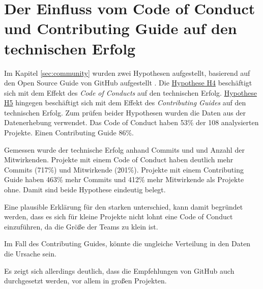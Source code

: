 



\section{Der Einfluss vom Code of Conduct und Contributing Guide auf den technischen Erfolg}

Im Kapitel \ref{sec:community} wurden zwei Hypothesen aufgestellt, basierend auf den Open Source 
Guide von GitHub aufgestellt \cite{GitHubBuildingWelcomingCommunities2022}.
Die \hyperref[H:4]{Hypothese H4} beschäftigt sich mit dem Effekt des \textit{Code of Conducts} auf
den technischen Erfolg. \hyperref[H:5]{Hypothese H5} hingegen beschäftigt sich mit dem Effekt des
\textit{Contributing Guides} auf den technischen Erfolg.
Zum prüfen beider Hypothesen wurden die Daten aus der Datenerhebung verwendet.
Das Code of Conduct haben 53\% der 108 analysierten Projekte. Einen Contributing Guide 86\%.

Gemessen wurde der technische Erfolg anhand Commits und und Anzahl der Mitwirkenden. Projekte mit 
einem Code of Conduct haben deutlich mehr Commits (717\%) und Mitwirkende (201\%).
Projekte mit einem Contributing Guide haben 463\% mehr Commits und 412\% mehr Mitwirkende als Projekte 
ohne.
Damit sind beide Hypothese eindeutig belegt.

Eine plausible Erklärung für den starken unterschied, kann damit begründet werden, dass es sich für 
kleine Projekte nicht lohnt eine Code of Conduct einzuführen, da die Größe der Teams zu klein ist.

Im Fall des Contributing Guides, könnte die ungleiche Verteilung in den Daten die Ursache sein.

Es zeigt sich allerdings deutlich, dass die Empfehlungen von GitHub auch durchgesetzt werden, vor allem
in großen Projekten. 



